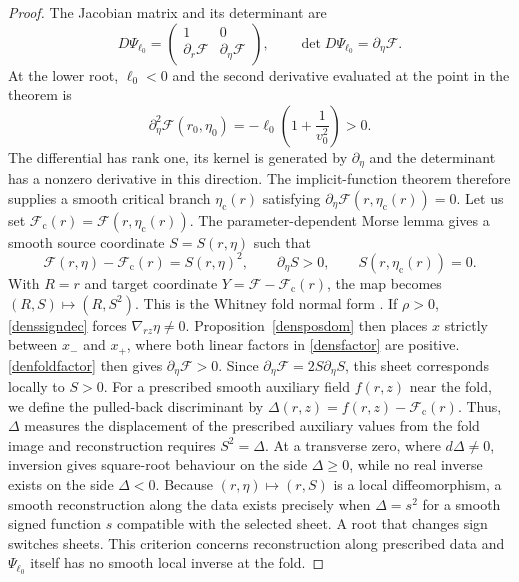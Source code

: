 \documentclass[amsmath,amsfonts,amssymb,aps,pra,superscriptaddress,10pt]{revtex4-2}
\numberwithin{equation}{section}
\theoremstyle{plain}
\theoremstyle{definition}
\theoremstyle{remark}
\theoremstyle{definition}
\newcommand{\ellzero}{\ell_0}
\begin{document}
\begin{proof}
The Jacobian matrix and its determinant are
\begin{equation}
D\Psi_{\ellzero}=\begin{pmatrix}1&0\\ \partial_r\mathcal{F}&\partial_\eta\mathcal{F}\end{pmatrix},
\qquad \det D\Psi_{\ellzero}=\partial_\eta\mathcal{F}.
\end{equation}
At the lower root, $\ellzero<0$ and the second derivative evaluated at the point in the theorem is
\begin{equation}
\partial_\eta^2\mathcal{F}(r_0,\eta_0)=-\ellzero\left(1+\frac1{v_0^2}\right)>0.
\end{equation}
The differential has rank one, its kernel is generated by $\partial_\eta$  and the determinant has a nonzero derivative in this direction. The implicit-function theorem therefore supplies a smooth critical branch $\eta_{\mathrm{c}}(r)$ satisfying $\partial_\eta\mathcal{F}(r,\eta_{\mathrm{c}}(r))=0$. Let us set $\mathcal{F}_{\mathrm{c}}(r)=\mathcal{F}(r,\eta_{\mathrm{c}}(r))$. The parameter-dependent Morse lemma gives a smooth source coordinate $S=S(r,\eta)$ such that
\begin{equation}
\mathcal{F}(r,\eta)-\mathcal{F}_{\mathrm{c}}(r)=S(r,\eta)^2,\qquad
\partial_\eta S>0,\qquad 
S(r,\eta_{\mathrm{c}}(r))=0.
\end{equation}
With $R=r$ and target coordinate $Y=\mathcal{F}-\mathcal{F}_{\mathrm{c}}(r)$, the map becomes $(R,S)\mapsto(R,S^2)$. This is the Whitney fold normal form \cite{GolubitskyGuillemin1973Stable}. If $\rho>0$, \eqref{denssigndec} forces $\nabla_{rz}\eta\neq 0$. Proposition~\ref{densposdom} then places $x$ strictly between $x_-$ and $x_+$, where both linear factors in \eqref{densfactor} are positive. \eqref{denfoldfactor} then gives $\partial_\eta\mathcal{F}>0$. Since $\partial_\eta\mathcal{F}=2S\partial_\eta S$, this sheet corresponds locally to $S>0$. For a prescribed smooth auxiliary field $f(r,z)$ near the fold, we define the pulled-back discriminant by $\Delta(r,z)=f(r,z)-\mathcal{F}_{\mathrm{c}}(r)$. Thus, $\Delta$ measures the displacement of the prescribed auxiliary values from the fold image and reconstruction requires $S^2=\Delta$. At a transverse zero, where $d\Delta\neq 0$, inversion gives square-root behaviour on the side $\Delta\geq 0$, while no real inverse exists on the side $\Delta<0$. Because $(r,\eta)\mapsto(r,S)$ is a local diffeomorphism, a smooth reconstruction along the data exists precisely when $\Delta=s^2$ for a smooth signed function $s$ compatible with the selected sheet. A root that changes sign switches sheets. This criterion concerns reconstruction along prescribed data and  $\Psi_{\ellzero}$ itself has no smooth local inverse at the fold.
\end{proof}
\end{document}
